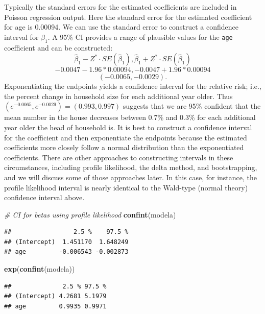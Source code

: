 \documentclass[
]{krantz}
\newenvironment{Shaded}{\begin{snugshade}}{\end{snugshade}}
\newcommand{\CommentTok}[1]{\textcolor[rgb]{0.37,0.37,0.37}{\textit{#1}}}
\newcommand{\KeywordTok}[1]{\textcolor[rgb]{0.27,0.27,0.27}{\textbf{#1}}}
\newcommand{\NormalTok}[1]{#1}
\begin{document}
Typically the standard errors for the estimated coefficients are included in Poisson regression output. Here the standard error for the estimated coefficient for age is 0.00094. We can use the standard error to construct a confidence interval for \(\beta_1\). A 95\% CI provides a range of plausible values for the \texttt{age} coefficient and can be constructed:
\[\hat\beta_1-Z^*\cdot SE(\hat\beta_1), \hat\beta_1+Z^*\cdot SE(\hat\beta_1)\]
\[-0.0047-1.96*0.00094, -0.0047+1.96*0.00094\]
\[ (-0.0065, -0.0029).
 \]
Exponentiating the endpoints yields a confidence interval for the relative risk; i.e., the percent change in household size for each additional year older. Thus \((e^{-0.0065},e^{-0.0029})=(0.993,0.997)\) suggests that we are 95\% confident that the mean number in the house decreases between 0.7\% and 0.3\% for each additional year older the head of household is. It is best to construct a confidence interval for the coefficient and then exponentiate the endpoints because the estimated coefficients more closely follow a normal distribution than the exponentiated coefficients. There are other approaches to constructing intervals in these circumstances, including profile likelihood, the delta method, and bootstrapping, and we will discuss some of those approaches later. In this case, for instance, the profile likelihood interval is nearly identical to the Wald-type (normal theory) confidence interval above.

\begin{Shaded}
\begin{Highlighting}[]
\CommentTok{# CI for betas using profile likelihood}
\KeywordTok{confint}\NormalTok{(modela)}
\end{Highlighting}
\end{Shaded}

\begin{verbatim}
##                 2.5 %    97.5 %
## (Intercept)  1.451170  1.648249
## age         -0.006543 -0.002873
\end{verbatim}

\begin{Shaded}
\begin{Highlighting}[]
\KeywordTok{exp}\NormalTok{(}\KeywordTok{confint}\NormalTok{(modela))}
\end{Highlighting}
\end{Shaded}

\begin{verbatim}
##              2.5 % 97.5 %
## (Intercept) 4.2681 5.1979
## age         0.9935 0.9971
\end{verbatim}
\end{document}
